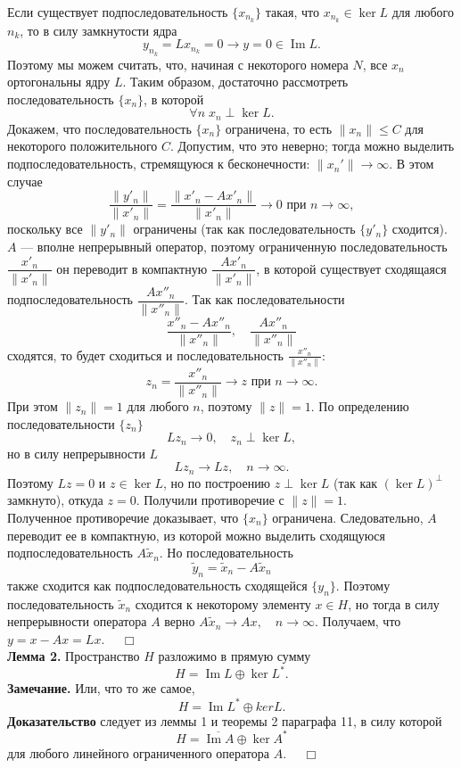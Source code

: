 \documentclass[12pt,a4paper, titlepage]{article}
\renewcommand{\Im}{\mathop{\mathrm{Im}}\nolimits}
\begin{document}
Если существует подпоследовательность $\{x_{n_k}\}$ такая, что $x_{n_k} \in \ker L$ для любого $n_k$, то в силу замкнутости ядра
$$
y_{n_k} = Lx_{n_k} = 0 \to y = 0 \in \Im L.
$$
Поэтому мы можем считать, что, начиная с некоторого номера $N$, все $x_n$ ортогональны ядру $L$. Таким образом, достаточно рассмотреть последовательность $\{x_n\}$, в которой 
$$
\forall n \; x_n \perp \ker L.
$$
Докажем, что последовательность $\{x_n\}$ ограничена, то есть $\|x_n\| \leqslant C$ для некоторого положительного $C$. Допустим, что это неверно; тогда можно выделить подпоследовательность, стремящуюся к бесконечности: $\|x_n'\| \to \infty$.
В этом случае 
$$
\frac{\|y'_n\|}{\|x'_n\|} = \frac{\|x'_n - Ax'_n\|}{\|x'_n\|} \to 0 \text{ при } n \to \infty,
$$
поскольку все $\|y'_n\|$ ограничены (так как последовательность $\{y'_n\}$ сходится). \\

$A$ --- вполне непрерывный оператор, поэтому ограниченную последовательность $\dfrac{x'_n}{\|x'_n\|}$ он переводит в компактную $\dfrac{Ax'_n}{\|x'_n\|}$, в которой существует сходящаяся подпоследовательность $\dfrac{Ax''_n}{\|x''_n\|}$. Так как последовательности
$$
\frac{x''_n - Ax''_n}{\|x''_n\|}, \quad \frac{Ax''_n}{\|x''_n\|}
$$
сходятся, то будет сходиться и последовательность $\frac{x''_n}{\|x''_n\|}$:
$$
z_n = \frac{x''_n}{\|x''_n\|} \to z \text{ при } n \to \infty.
$$
При этом $\|z_n\| = 1$ для любого $n$, поэтому $\|z\| = 1$. По определению последовательности $\{z_n\}$
$$
Lz_n \to 0, \quad z_n \perp \ker L,
$$
но в силу непрерывности $L$ 
$$
Lz_n \to Lz, \quad n \to \infty.
$$
Поэтому $Lz = 0$ и $z \in \ker L$, но по построению $z \perp \ker L$ (так как $(\ker L)^\perp$ замкнуто), откуда $z = 0$. Получили противоречие с $\|z\| = 1$.\\

Полученное противоречие доказывает, что $\{x_n\}$ ограничена. Следовательно, $A$ переводит ее в компактную, из которой можно выделить сходящуюся подпоследовательность $A\tilde x_n$. Но последовательность
$$
\tilde y_n = \tilde x_n - A\tilde x_n
$$
также сходится как подпоследовательность сходящейся $\{y_n\}$. Поэтому последовательность $\tilde x_n$ сходится к некоторому элементу $x \in H$, но тогда в силу непрерывности оператора $A$ верно $A\tilde x_n \to Ax,\quad n \to \infty$. Получаем, что $y = x - Ax = Lx$. $\quad \Box$\\

\textbf{Лемма 2.} Пространство $H$ разложимо в прямую сумму
$$
H = \Im L \oplus \ker L^*.
$$
\textbf{Замечание.} Или, что то же самое,
$$
H = \Im L^* \oplus ker L.
$$
\textbf{Доказательство} следует из леммы 1 и теоремы 2 параграфа 11, в силу которой
$$
H = \overline{\Im A} \oplus \ker A^*
$$
для любого линейного ограниченного оператора $A$. $\quad \Box$\\
\end{document}
